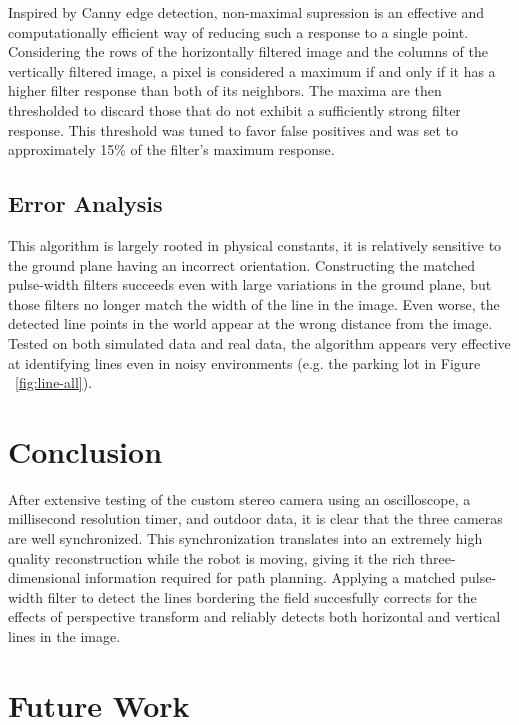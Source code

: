 \documentclass[11pt,twocolumn]{article}
\begin{document}
Inspired by Canny edge detection, non-maximal supression is an effective and
computationally efficient way of reducing such a response to a single point.
Considering the rows of the horizontally filtered image and the columns of the
vertically filtered image, a pixel is considered a maximum if and only if it
has a higher filter response than both of its neighbors. The maxima are then
thresholded to discard those that do not exhibit a sufficiently strong filter
response. This threshold was tuned to favor false positives and was set to
approximately 15\% of the filter's maximum response.

\subsection{Error Analysis}
\label{sec:line-error}
This algorithm is largely rooted in physical constants, it is relatively sensitive to the ground plane having an incorrect orientation. Constructing the matched pulse-width filters succeeds even with large variations in the ground plane, but those filters no longer match the width of the line in the image. Even worse, the detected line points in the world appear at the wrong distance from the image. Tested on both simulated data and real data, the algorithm appears very effective at identifying lines even in noisy environments (e.g. the parking lot in Figure ~\ref{fig:line-all}).

\section{Conclusion}
\label{sec:conclusion}
After extensive testing of the custom stereo camera using an oscilloscope, a millisecond resolution timer, and outdoor data, it is clear that the three cameras are well synchronized. This synchronization translates into an extremely high quality reconstruction while the robot is moving, giving it the rich three-dimensional information required for path planning. Applying a matched pulse-width filter to detect the lines bordering the field succesfully corrects for the effects of perspective transform and reliably detects both horizontal and vertical lines in the image. 

\section{Future Work}

\label{sec:future}
\end{document}
